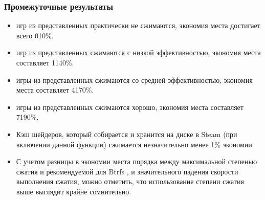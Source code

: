 \documentclass[letterpaper,10pt,russian,openany]{sphinxmanual}
\begin{document}
\subsubsection{Промежуточные результаты}
\label{\detokenize{source/file-systems:intermediate-results}}\label{\detokenize{source/file-systems:index-6}}\label{\detokenize{source/file-systems:id7}}\begin{itemize}
\item {} 
\sphinxAtStartPar
{} игр из представленных  \sphinxhyphen{} практически не сжимаются, экономия места достигает всего 0\sphinxhyphen{}10\%.

\item {} 
\sphinxAtStartPar
{} игр из представленных  \sphinxhyphen{} сжимаются с низкой эффективностью, экономия места составляет 11\sphinxhyphen{}40\%.

\item {} 
\sphinxAtStartPar
{} игры из представленных  \sphinxhyphen{} сжимаются со средней эффективностью, экономия места составляет 41\sphinxhyphen{}70\%.

\item {} 
\sphinxAtStartPar
{} игры из представленных  \sphinxhyphen{} сжимаются хорошо, экономия места составляет 71\sphinxhyphen{}90\%.

\item {} 
\sphinxAtStartPar
Кэш шейдеров, который собирается и хранится на диске в Steam (при включении данной функции) сжимается незначительно \sphinxhyphen{} менее 1\% экономии.

\item {} 
\sphinxAtStartPar
С учетом разницы в экономии места порядка  между максимальной степенью сжатия  и рекомендуемой для Btrfs \sphinxhyphen{} ,
и значительного падения скорости выполнения сжатия, можно отметить, что использование степени сжатия выше  выглядит крайне сомнительно.

\end{itemize}

\sphinxstepscope
\end{document}
